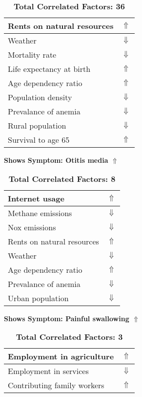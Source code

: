 \documentclass[12pt,notitlepage,oneside]{report}
\begin{document}
\begin{table}[!htb]
\begin{tabular}{|l|l|}
Rents on natural resources & $\Uparrow$\\ \hline
Weather & $\Downarrow$\\ \hline
Mortality rate & $\Downarrow$\\ \hline
Life expectancy at birth & $\Uparrow$\\ \hline
Age dependency ratio & $\Uparrow$\\ \hline
Population density & $\Downarrow$\\ \hline
Prevalance of anemia & $\Downarrow$\\ \hline
Rural population & $\Downarrow$\\ \hline
Survival to age 65 & $\Uparrow$\\ \hline
\end{tabular}
\caption*{\textbf{Total Correlated Factors: 36}}
\end{table}
\clearpage
\begin{table}[!htb]
\caption{\textbf{Shows Symptom: Otitis media $\Uparrow$}}
\centering
\label{Correlated Socio-economic Factors0}
\begin{tabular}{|l|l|}
\hline
Internet usage & $\Uparrow$\\ \hline
Methane emissions & $\Downarrow$\\ \hline
Nox emissions & $\Downarrow$\\ \hline
Rents on natural resources & $\Uparrow$\\ \hline
Weather & $\Downarrow$\\ \hline
Age dependency ratio & $\Uparrow$\\ \hline
Prevalance of anemia & $\Downarrow$\\ \hline
Urban population & $\Downarrow$\\ \hline
\end{tabular}
\caption*{\textbf{Total Correlated Factors: 8}}
\end{table}
\begin{table}[!htb]
\caption{\textbf{Shows Symptom: Painful swallowing $\Uparrow$}}
\centering
\label{Correlated Socio-economic Factors0}
\begin{tabular}{|l|l|}
\hline
Employment in agriculture & $\Uparrow$\\ \hline
Employment in services & $\Downarrow$\\ \hline
Contributing family workers & $\Uparrow$\\ \hline
\end{tabular}
\caption*{\textbf{Total Correlated Factors: 3}}
\end{table}
\end{document}
